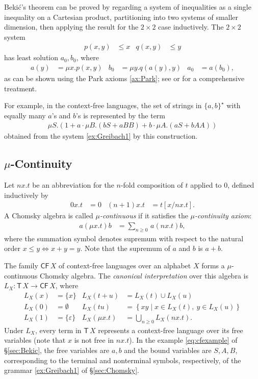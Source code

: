 \documentclass[copyright,creativecommons]{eptcs}
\theoremstyle{remark}
\newcommand\fun{\mathrel\rightarrow}
\newcommand\subst[2]{[#1/#2]}
\newcommand\Iff{\mathrel\Leftrightarrow}
\newcommand\eps\varepsilon
\newcommand\set[2]{\left\{#1\mid #2\right\}}
\newcommand\mathname[1]{\ensuremath{\mathsf{#1}}}
\newcommand\cset[1]{\{#1\}}
\newcommand\CFname{\mathname{CF}}
\newcommand\CF[1]{\CFname\,#1}
\newcommand\Tname{\mathname{T}}
\newcommand\T[1]{\Tname\,#1}
\begin{document}
Beki\'c's theorem can be proved by regarding a system of inequalities as a single inequality on a Cartesian product, partitioning into two systems of smaller dimension, then applying the result for the $2\times 2$ case inductively. The $2\times 2$ system
\begin{align*}
p(x,y) &\leq x & q(x,y) &\leq y\end{align*}
has least solution $a_0,b_0$, where
\begin{align*}
a(y) &= \mu x.p(x,y) & b_0 &= \mu y.q(a(y),y) & a_0 &= a(b_0),
\end{align*}
as can be shown using the Park axioms \eqref{ax:Park}; see \cite{Winskel93} or \cite{EsikLeiss05} for a comprehensive treatment.


For example, in the context-free languages, the set of strings in $\{a,b\}^\star$ with equally many $a$'s and $b$'s is represented by the term
\begin{align}
\mu S.(1+a\cdot \mu B.(bS+aBB) + b\cdot \mu A.(aS+bAA))\label{eq:cfexample}
\end{align}
obtained from the system \eqref{ex:Greibach1} by this construction.

\subsection{$\mu$-Continuity}
\label{sec:continuity}

Let $nx.t$ be an abbreviation for the $n$-fold composition of $t$ applied to $0$, defined inductively by
\begin{align*}
0x.t &= 0 & (n{+}1)x.t &= t\subst x{nx.t}.
\end{align*}
A Chomsky algebra is called \emph{$\mu$-continuous} if it satisfies the \emph{$\mu$-continuity axiom}:
\begin{align}
a(\mu x.t)b &= \sum_{n\geq 0}\,a(nx.t)b,\label{ax:mucont}
\end{align}
where the summation symbol denotes supremum with respect to the natural order $x \leq y 
\Iff x+y=y$. Note that the supremum of $a$ and $b$ is $a+b$.

\newcommand\canon[1]{L_{#1}}

The family $\CF X$ of context-free languages over an alphabet $X$ forms a $\mu$-continuous Chomsky algebra. The \emph{canonical interpretation} over this algebra is $\canon X:\T X\fun\CF X$, where
\begin{align}
\canon X(x) &= \{x\} &
\canon X(t + u) &= \canon X(t)\cup \canon X(u)\nonumber\\
\canon X(0) &=\emptyset &
\canon X(tu) &= \set{xy}{x\in \canon X(t),\ y\in \canon X(u)}\label{ax:Ldef}\\
\canon X(1) &= \cset{\eps} &
\canon X(\mu x.t) &= \bigcup_{n\geq 0} \canon X(nx.t).\nonumber
\end{align}
Under $\canon X$, every term in $\T X$ represents a context-free language over its free variables (note that $x$ is not free in $nx.t$). In the example \eqref{eq:cfexample} of \S\ref{sec:Bekic}, the free variables are $a,b$ and the bound variables are $S,A,B$, corresponding to the terminal and nonterminal symbols, respectively, of the grammar \eqref{ex:Greibach1} of \S\ref{sec:Chomsky}.
\end{document}
